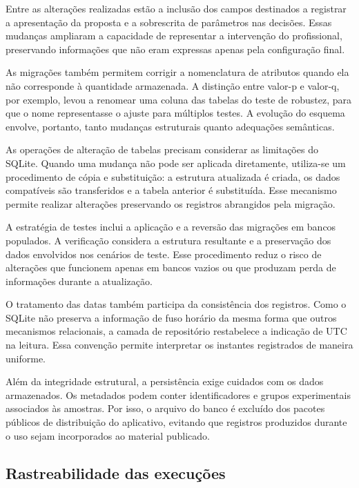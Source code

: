 Entre as alterações realizadas estão a inclusão dos campos destinados a registrar a apresentação da proposta e a sobrescrita de parâmetros nas decisões. Essas mudanças ampliaram a capacidade de representar a intervenção do profissional, preservando informações que não eram expressas apenas pela configuração final.

As migrações também permitem corrigir a nomenclatura de atributos quando ela não corresponde à quantidade armazenada. A distinção entre valor-p e valor-q, por exemplo, levou a renomear uma coluna das tabelas do teste de robustez, para que o nome representasse o ajuste para múltiplos testes. A evolução do esquema envolve, portanto, tanto mudanças estruturais quanto adequações semânticas.

As operações de alteração de tabelas precisam considerar as limitações do SQLite. Quando uma mudança não pode ser aplicada diretamente, utiliza-se um procedimento de cópia e substituição: a estrutura atualizada é criada, os dados compatíveis são transferidos e a tabela anterior é substituída. Esse mecanismo permite realizar alterações preservando os registros abrangidos pela migração.

A estratégia de testes inclui a aplicação e a reversão das migrações em bancos populados. A verificação considera a estrutura resultante e a preservação dos dados envolvidos nos cenários de teste. Esse procedimento reduz o risco de alterações que funcionem apenas em bancos vazios ou que produzam perda de informações durante a atualização.

O tratamento das datas também participa da consistência dos registros. Como o SQLite não preserva a informação de fuso horário da mesma forma que outros mecanismos relacionais, a camada de repositório restabelece a indicação de UTC na leitura. Essa convenção permite interpretar os instantes registrados de maneira uniforme.

Além da integridade estrutural, a persistência exige cuidados com os dados armazenados. Os metadados podem conter identificadores e grupos experimentais associados às amostras. Por isso, o arquivo do banco é excluído dos pacotes públicos de distribuição do aplicativo, evitando que registros produzidos durante o uso sejam incorporados ao material publicado.

\subsection{Rastreabilidade das execuções}
\label{subsec:rastreabilidade-execucoes}

